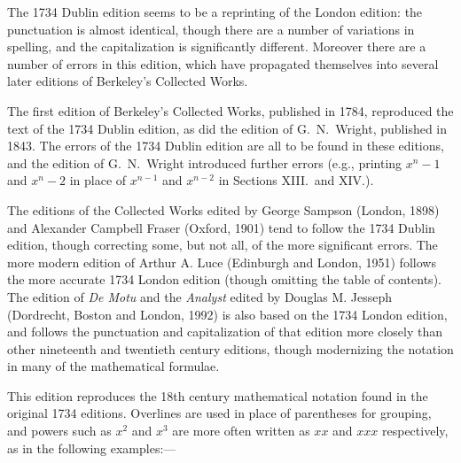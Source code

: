 The 1734 Dublin edition seems to be a reprinting of the
London edition: the punctuation is almost identical, though
there are a number of variations in spelling, and the
capitalization is significantly different.  Moreover there
are a number of errors in this edition, which have
propagated themselves into several later editions of
Berkeley's Collected Works.

The first edition of Berkeley's Collected Works, published
in 1784, reproduced the text of the 1734 Dublin edition,
as did the edition of G.~N.\ Wright, published in 1843.
The errors of the 1734 Dublin edition are all to be found
in these editions, and the edition of G.~N.\ Wright
introduced further errors (e.g., printing $x^n - 1$
and $x^n - 2$ in place of $x^{n-1}$ and $x^{n-2}$ in
Sections XIII.\ and XIV.).

The editions of the Collected Works edited by George Sampson
(London, 1898) and Alexander Campbell Fraser (Oxford, 1901) tend
to follow the 1734 Dublin edition, though correcting some, but
not all, of the more significant errors.  The more modern edition
of Arthur A. Luce (Edinburgh and London, 1951) follows the more
accurate 1734 London edition (though omitting the table of
contents).  The edition of {\it De Motu\/} and the
{\it Analyst\/} edited by Douglas M. Jesseph (Dordrecht, Boston
and London, 1992) is also based on the 1734 London edition, and
follows the punctuation and capitalization of that edition more
closely than other nineteenth and twentieth century editions,
though modernizing the notation in many of the mathematical
formulae.

\bigbreak

This edition reproduces the 18th century mathematical notation
found in the original 1734 editions.  Overlines are used
in place of parentheses for grouping, and powers such as
$x^2$ and $x^3$ are more often written as $xx$ and
$xxx$ respectively, as in the following examples:---

\smallskip



